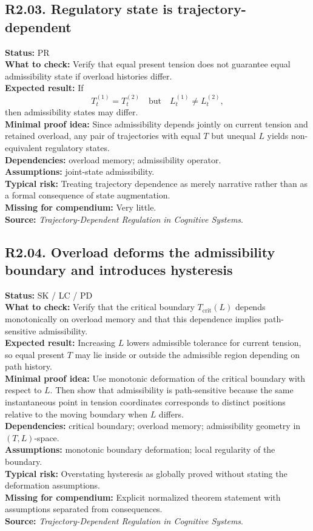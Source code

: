 \documentclass[12pt]{article}
\begin{document}
	\subsection*{R2.03. Regulatory state is trajectory-dependent}
	\textbf{Status:} PR \\
	\textbf{What to check:} Verify that equal present tension does not guarantee equal admissibility state if overload histories differ. \\
	\textbf{Expected result:} If
	\[
	T_t^{(1)}=T_t^{(2)}
	\quad \text{but} \quad
	L_t^{(1)}\neq L_t^{(2)},
	\]
	then admissibility states may differ. \\
	\textbf{Minimal proof idea:} Since admissibility depends jointly on current tension and retained overload, any pair of trajectories with equal $T$ but unequal $L$ yields non-equivalent regulatory states. \\
	\textbf{Dependencies:} overload memory; admissibility operator. \\
	\textbf{Assumptions:} joint-state admissibility. \\
	\textbf{Typical risk:} Treating trajectory dependence as merely narrative rather than as a formal consequence of state augmentation. \\
	\textbf{Missing for compendium:} Very little. \\
	\textbf{Source:} \emph{Trajectory-Dependent Regulation in Cognitive Systems}.
	
	\subsection*{R2.04. Overload deforms the admissibility boundary and introduces hysteresis}
	\textbf{Status:} SK / LC / PD \\
	\textbf{What to check:} Verify that the critical boundary $T_{\mathrm{crit}}(L)$ depends monotonically on overload memory and that this dependence implies path-sensitive admissibility. \\
	\textbf{Expected result:} Increasing $L$ lowers admissible tolerance for current tension, so equal present $T$ may lie inside or outside the admissible region depending on path history. \\
	\textbf{Minimal proof idea:} Use monotonic deformation of the critical boundary with respect to $L$. Then show that admissibility is path-sensitive because the same instantaneous point in tension coordinates corresponds to distinct positions relative to the moving boundary when $L$ differs. \\
	\textbf{Dependencies:} critical boundary; overload memory; admissibility geometry in $(T,L)$-space. \\
	\textbf{Assumptions:} monotonic boundary deformation; local regularity of the boundary. \\
	\textbf{Typical risk:} Overstating hysteresis as globally proved without stating the deformation assumptions. \\
	\textbf{Missing for compendium:} Explicit normalized theorem statement with assumptions separated from consequences. \\
	\textbf{Source:} \emph{Trajectory-Dependent Regulation in Cognitive Systems}.
	
\end{document}
